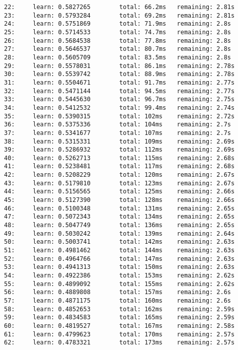 \documentclass[11pt]{article}
\begin{document}
\begin{Verbatim}[commandchars=\\\{\}]
22:     learn: 0.5827265        total: 66.2ms   remaining: 2.81s
23:     learn: 0.5793284        total: 69.2ms   remaining: 2.81s
24:     learn: 0.5751869        total: 71.9ms   remaining: 2.8s
25:     learn: 0.5714533        total: 74.7ms   remaining: 2.8s
26:     learn: 0.5684538        total: 77.8ms   remaining: 2.8s
27:     learn: 0.5646537        total: 80.7ms   remaining: 2.8s
28:     learn: 0.5605709        total: 83.5ms   remaining: 2.8s
29:     learn: 0.5578031        total: 86.1ms   remaining: 2.78s
30:     learn: 0.5539742        total: 88.9ms   remaining: 2.78s
31:     learn: 0.5504671        total: 91.7ms   remaining: 2.77s
32:     learn: 0.5471144        total: 94.5ms   remaining: 2.77s
33:     learn: 0.5445630        total: 96.7ms   remaining: 2.75s
34:     learn: 0.5412532        total: 99.4ms   remaining: 2.74s
35:     learn: 0.5390315        total: 102ms    remaining: 2.72s
36:     learn: 0.5375336        total: 104ms    remaining: 2.7s
37:     learn: 0.5341677        total: 107ms    remaining: 2.7s
38:     learn: 0.5315331        total: 109ms    remaining: 2.69s
39:     learn: 0.5286932        total: 112ms    remaining: 2.69s
40:     learn: 0.5262713        total: 115ms    remaining: 2.68s
41:     learn: 0.5238481        total: 117ms    remaining: 2.68s
42:     learn: 0.5208229        total: 120ms    remaining: 2.67s
43:     learn: 0.5179810        total: 123ms    remaining: 2.67s
44:     learn: 0.5156565        total: 125ms    remaining: 2.66s
45:     learn: 0.5127390        total: 128ms    remaining: 2.66s
46:     learn: 0.5100348        total: 131ms    remaining: 2.65s
47:     learn: 0.5072343        total: 134ms    remaining: 2.65s
48:     learn: 0.5047749        total: 136ms    remaining: 2.65s
49:     learn: 0.5030242        total: 139ms    remaining: 2.64s
50:     learn: 0.5003741        total: 142ms    remaining: 2.63s
51:     learn: 0.4981462        total: 144ms    remaining: 2.63s
52:     learn: 0.4964766        total: 147ms    remaining: 2.63s
53:     learn: 0.4941313        total: 150ms    remaining: 2.63s
54:     learn: 0.4922386        total: 153ms    remaining: 2.62s
55:     learn: 0.4899092        total: 155ms    remaining: 2.62s
56:     learn: 0.4889808        total: 157ms    remaining: 2.6s
57:     learn: 0.4871175        total: 160ms    remaining: 2.6s
58:     learn: 0.4852653        total: 162ms    remaining: 2.59s
59:     learn: 0.4834583        total: 165ms    remaining: 2.59s
60:     learn: 0.4819527        total: 167ms    remaining: 2.58s
61:     learn: 0.4799623        total: 170ms    remaining: 2.57s
62:     learn: 0.4783321        total: 173ms    remaining: 2.57s

\end{Verbatim}
\end{document}
